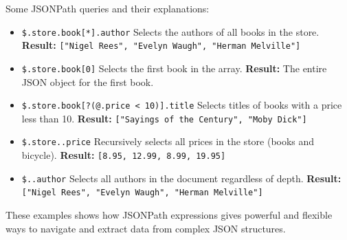 Some JSONPath queries and their explanations:

\begin{itemize}
	\item \texttt{\$.store.book[*].author}  
	Selects the authors of all books in the store.  
	\textbf{Result:} \texttt{["Nigel Rees", "Evelyn Waugh", "Herman Melville"]}
	
	\item \texttt{\$.store.book[0]}  
	Selects the first book in the array.  
	\textbf{Result:} The entire JSON object for the first book.
	
	\item \texttt{\$.store.book[?(@.price < 10)].title}  
	Selects titles of books with a price less than 10.  
	\textbf{Result:} \texttt{["Sayings of the Century", "Moby Dick"]}
	
	\item \texttt{\$.store..price}  
	Recursively selects all prices in the store (books and bicycle).  
	\textbf{Result:} \texttt{[8.95, 12.99, 8.99, 19.95]}
	
	\item \texttt{\$..author}  
	Selects all authors in the document regardless of depth.  
	\textbf{Result:} \texttt{["Nigel Rees", "Evelyn Waugh", "Herman Melville"]}
\end{itemize}

These examples shows how JSONPath expressions gives powerful and flexible ways to navigate and extract data from complex JSON structures.
